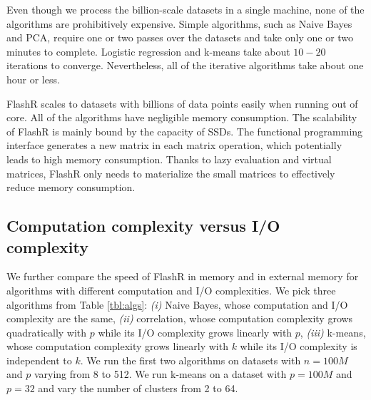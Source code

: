 Even though we process the billion-scale datasets in a single machine, none of
the algorithms are prohibitively expensive. Simple algorithms, such as
Naive Bayes and PCA, require one or two passes over the datasets and take
only one or two minutes to complete. Logistic regression and k-means take
about $10-20$ iterations to converge.
Nevertheless, all of the iterative algorithms take about one hour or less.

FlashR scales to datasets with billions of data points easily when running
out of core. All of the algorithms have negligible memory consumption.
The scalability of FlashR is mainly bound by the capacity of SSDs.
The functional programming
interface generates a new matrix in each matrix operation, which potentially
leads to high memory consumption. Thanks to lazy evaluation and virtual matrices,
FlashR only needs to materialize the small matrices to effectively reduce
memory consumption.

\subsection{Computation complexity versus I/O complexity}
We further compare the speed of FlashR in memory and in external memory
for algorithms with different computation and I/O complexities.
We pick three algorithms from Table \ref{tbl:algs}: \textit{(i)} Naive Bayes,
whose computation and I/O complexity are the same, \textit{(ii)}
correlation, whose computation complexity grows quadratically with $p$ while
its I/O complexity grows linearly with $p$, \textit{(iii)} k-means, whose computation
complexity grows linearly with $k$ while its I/O complexity is independent
to $k$. We run the first two algorithms on datasets with $n=100M$ and $p$
varying from 8 to 512. We run k-means on a dataset with $p=100M$ and $p=32$
and vary the number of clusters from 2 to 64.

